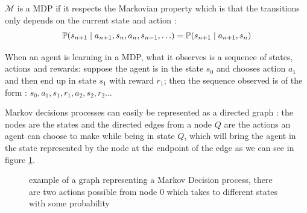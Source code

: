 \documentclass[14pt,a4paper]{article}
\theoremstyle{definition}
\begin{document}
$\mathcal{M}$ is a MDP if it respects the Markovian property which is that the transitions only depends on the current state and action : 
\begin{equation*}
\mathbb{P}(s_{n+1}\mid a_{n+1},s_{n},a_{n},s_{n-1},\ldots)=\mathbb{P}(s_{n+1}\mid a_{n+1},s_{n})\\
\end{equation*}


When an agent is learning in a MDP, what it observes is a sequence of states, actions and rewards: suppose the agent is in the state $s_0$ and chooses action $a_1$ and then end up in state $s_1$ with reward $r_1$; then the sequence observed is of the form : $s_0,a_1,s_1,r_1,a_2,s_2,r_2\ldots$


Markov decisions processes can easily be  represented as a directed graph : the nodes are the states and the directed edges from a node $Q$ are the actions an agent can choose to make while being in state $Q$, which will bring the agent in the state represented by the node at the endpoint of the edge as we can see in figure \ref{figure : graph_example}.


\begin{figure}[H]
\centering
    \label{figure : graph_example}
    \begin{center}
        \caption{example of a graph representing a Markov Decision process, there are two actions possible from node $0$ which takes to different states with some probability }
    \end{center}
\end{figure}  
\end{document}
